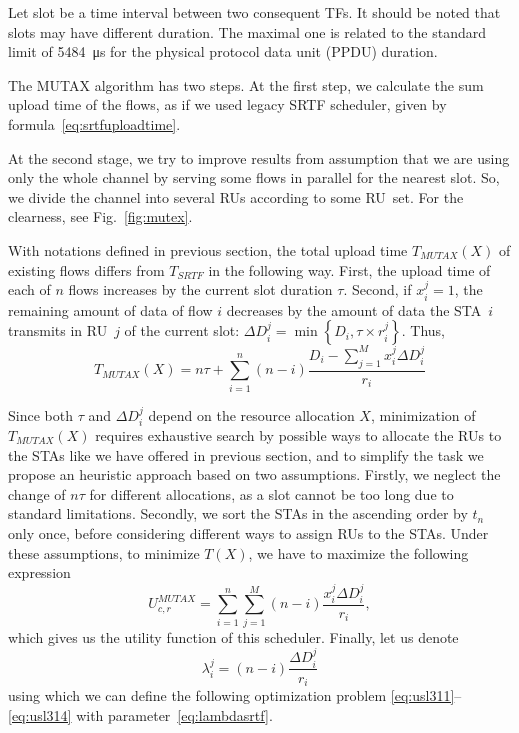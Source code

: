 Let slot be a time interval between two consequent TFs.
It should be noted that slots may have different duration. The maximal one is related to the standard limit of \SI{5484}{\us} for the physical protocol data unit (PPDU) duration.

The MUTAX algorithm has two steps. At the first step, we calculate the sum upload time of the flows, as if we used legacy SRTF scheduler, given by formula~\eqref{eq:srtfuploadtime}.

At the second stage, we try to improve results from assumption that we are using only the whole channel by serving some flows in parallel for the nearest slot. So, we divide the channel into several RUs according to some RU~set. For the clearness, see Fig.~\ref{fig:mutex}.

With notations defined in previous section, the total upload time $T_{MUTAX}\left(X\right)$ of existing flows differs from $T_{SRTF}$ in the following way. First, the upload time of each of $n$ flows increases by the current slot duration $\tau$. Second, if $x_i^j=1$, the remaining amount of data of flow $i$ decreases by the amount of data the STA~$i$ transmits in RU~$j$ of the current slot: $\Delta D_i^j = \min\left\{D_i, \tau \times r_{i}^{j}\right\}$. Thus,  
\begin{equation}
T_{MUTAX}\left(X\right) = n \tau + \sum_{i = 1}^{n} \left(n - i\right) \frac{D_i -  \sum_{j = 1}^{M} x_i^j \Delta D_i^j}{r_{i}}
\end{equation}

Since both $\tau$ and  $\Delta D_i^j$ depend on the resource allocation $X$, minimization of $T_{MUTAX}(X)$ requires exhaustive search by possible ways to allocate the RUs to the STAs like we have offered in previous section, and to simplify the task we propose an heuristic approach based on two assumptions.
Firstly, we neglect the change of $n \tau$ for different allocations, as a slot cannot be too long due to standard limitations.
Secondly, we sort the STAs in the ascending order by $t_n$ only once, before considering different ways to assign RUs to the STAs.
Under these assumptions, to minimize  $T(X)$, we have to maximize the following expression 
\begin{equation}
\label{eq:11axsrtfutility}
U_{c,r}^{MUTAX} = 
\sum_{i = 1}^{n} \sum_{j = 1}^{M } \left(n - i\right) \frac{x_i^j \Delta D_i^j}{r_{i}},
\end{equation}
which gives us the utility function of this scheduler. Finally, let us denote 
\begin{equation}
\label{eq:lambdasrtf}
\lambda_i^j = \left(n - i\right) \frac{\Delta D_i^j}{r_{i}}
\end{equation}
using which we can define the following optimization problem \eqref{eq:usl311}--\eqref{eq:usl314} with parameter~\eqref{eq:lambdasrtf}.

